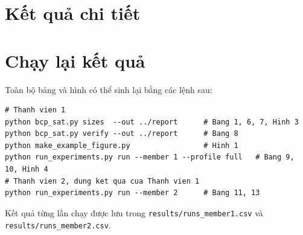 \section{Kết quả chi tiết}\label{app:detail}

{\footnotesize

}

\section{Chạy lại kết quả}\label{app:repro}

Toàn bộ bảng và hình có thể sinh lại bằng các lệnh sau:
\begin{verbatim}
# Thanh vien 1
python bcp_sat.py sizes  --out ../report      # Bang 1, 6, 7, Hinh 3
python bcp_sat.py verify --out ../report      # Bang 8
python make_example_figure.py                 # Hinh 1
python run_experiments.py run --member 1 --profile full   # Bang 9, 10, Hinh 4
# Thanh vien 2, dung ket qua cua Thanh vien 1
python run_experiments.py run --member 2      # Bang 11, 13
\end{verbatim}
Kết quả từng lần chạy được lưu trong \texttt{results/runs\_member1.csv} và \texttt{results/runs\_member2.csv}.
